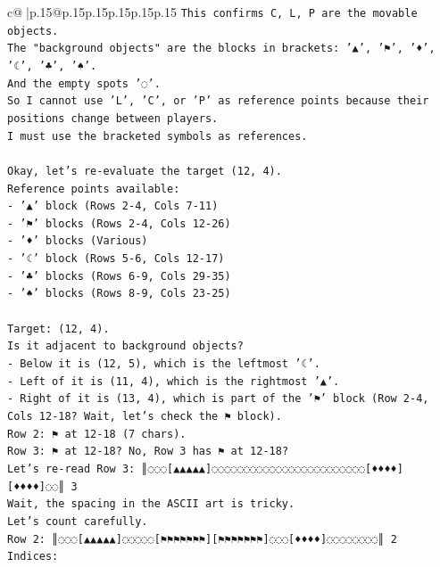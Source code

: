 \documentclass{article}
\begin{document}
{\begin{supertabular}{c@{$\;$}|p{.15\linewidth}@{}p{.15\linewidth}p{.15\linewidth}p{.15\linewidth}p{.15\linewidth}p{.15\linewidth}}
{{{\texttt{This confirms C, L, P are the movable objects.} \\
\texttt{The "background objects" are the blocks in brackets: '▲', '⚑', '♦', '☾', '♣', '♠'.} \\
\texttt{And the empty spots '◌'.} \\
\texttt{So I cannot use 'L', 'C', or 'P' as reference points because their positions change between players.} \\
\texttt{I must use the bracketed symbols as references.} \\
\\ 
\texttt{Okay, let's re{-}evaluate the target (12, 4).} \\
\texttt{Reference points available:} \\
\texttt{{-} '▲' block (Rows 2{-}4, Cols 7{-}11)} \\
\texttt{{-} '⚑' blocks (Rows 2{-}4, Cols 12{-}26)} \\
\texttt{{-} '♦' blocks (Various)} \\
\texttt{{-} '☾' block (Rows 5{-}6, Cols 12{-}17)} \\
\texttt{{-} '♣' blocks (Rows 6{-}9, Cols 29{-}35)} \\
\texttt{{-} '♠' blocks (Rows 8{-}9, Cols 23{-}25)} \\
\\ 
\texttt{Target: (12, 4).} \\
\texttt{Is it adjacent to background objects?} \\
\texttt{{-} Below it is (12, 5), which is the leftmost '☾'.} \\
\texttt{{-} Left of it is (11, 4), which is the rightmost '▲'.} \\
\texttt{{-} Right of it is (13, 4), which is part of the '⚑' block (Row 2{-}4, Cols 12{-}18? Wait, let's check the ⚑ block).} \\
\texttt{Row 2: ⚑ at 12{-}18 (7 chars).} \\
\texttt{Row 3: ⚑ at 12{-}18? No, Row 3 has ⚑ at 12{-}18?} \\
\texttt{Let's re{-}read Row 3: ║◌◌◌{[}▲▲▲▲▲{]}◌◌◌◌◌◌◌◌◌◌◌◌◌◌◌◌◌◌◌◌◌◌◌◌{[}♦♦♦♦{]}{[}♦♦♦♦{]}◌◌║ 3} \\
\texttt{Wait, the spacing in the ASCII art is tricky.} \\
\texttt{Let's count carefully.} \\
\texttt{Row 2: ║◌◌◌{[}▲▲▲▲▲{]}◌◌◌◌◌{[}⚑⚑⚑⚑⚑⚑⚑{]}{[}⚑⚑⚑⚑⚑⚑⚑{]}◌◌◌{[}♦♦♦♦{]}◌◌◌◌◌◌◌◌║ 2} \\
\texttt{Indices:} \\
}}}
\end{supertabular}}
\end{document}
